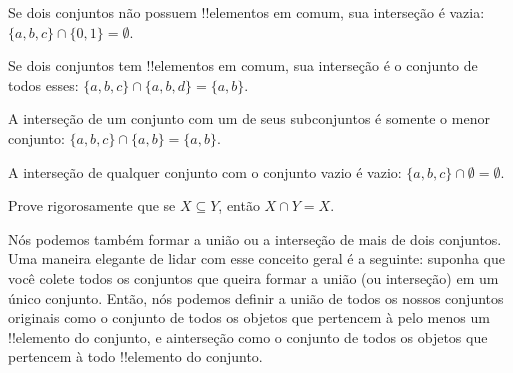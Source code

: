 \documentclass[../../../include/open-logic-section]{subfiles}
\begin{document}
\begin{ex}
Se dois conjuntos não possuem !!{elemento}s em comum, sua interseção é vazia:
$\{ a, b, c\} \cap \{ 0, 1\} = \emptyset$.

Se dois conjuntos tem !!{elemento}s em comum, sua interseção é o conjunto
de todos esses: $\{a, b, c \} \cap \{a, b, d \} = \{a, b\}$.

A interseção de um conjunto com um de seus subconjuntos é somente o menor conjunto: $\{a, b, c\} \cap \{a, b\} = \{a, b\}$.

A interseção de qualquer conjunto com o conjunto vazio é vazio:
$\{a, b, c \} \cap \emptyset = \emptyset$.
\end{ex}





\begin{prob}
Prove rigorosamente que se $X \subseteq Y$, então $X \cap Y = X$.
\end{prob}


\begin{explain}
Nós podemos também formar a união ou a interseção de mais de dois conjuntos.
Uma maneira elegante de lidar com esse conceito geral é a seguinte: suponha que você colete todos os conjuntos que queira formar a união
(ou interseção) em um único conjunto. Então, nós podemos definir a união
de todos os nossos conjuntos originais como o conjunto de todos os objetos que pertencem à pelo menos um !!{elemento} do conjunto, e ainterseção como o conjunto de todos os objetos que pertencem à todo !!{elemento} do conjunto.
\end{explain}

\end{document}
